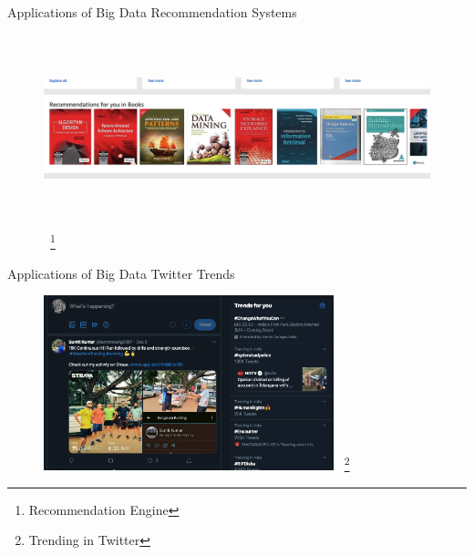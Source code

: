 \documentclass[pdf]{beamer}
\begin{document}
\begin{frame}[fragile]{Applications of Big Data}
Recommendation Systems
	 \begin{figure}[ht]
	    \begin{center}
        		\includegraphics[height=2.2in]{3.png}
            ~\footnote{Recommendation Engine}
    \end{center}
    \end{figure}
\end{frame}

\begin{frame}[fragile]{Applications of Big Data}
Twitter Trends
	 \begin{figure}[ht]
	    \begin{center}
        		\includegraphics[height=2in]{4.png}
            ~\footnote{Trending in Twitter}
    \end{center}
    \end{figure}
\end{frame}
\end{document}
